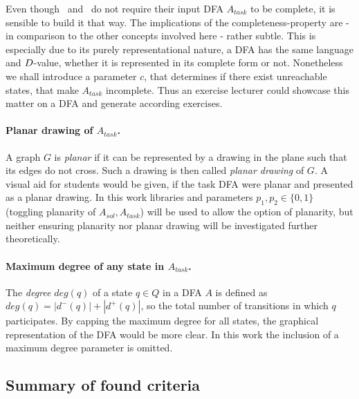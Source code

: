 Even though \CompUnr\ and \RemUnr\ do not require their input DFA $A_{task}$ to be complete, it is sensible to build it that way. The implications of the completeness-property are - in comparison to the other concepts involved here - rather subtle. This is especially due to its purely representational nature, a DFA has the same language and $D$-value, whether it is represented in its complete form or not. Nonetheless we shall introduce a parameter $c$, that determines if there exist unreachable states, that make $A_{task}$ incomplete. Thus an exercise lecturer could showcase this matter on a DFA and generate according exercises.

\paragraph*{Planar drawing of $A_{task}$.}

A graph $G$ is \emph{planar} if it can be represented by a drawing in the plane such that its edges do not cross. Such a drawing is then called \emph{planar drawing} of $G$. A visual aid for students would be given, if the task DFA were planar and presented as a planar drawing. In this work libraries and parameters $p_1, p_2 \in \{0,1\}$ (toggling planarity of $A_{sol}, A_{task}$) will be used to allow the option of planarity, but neither ensuring planarity nor planar drawing will be investigated further theoretically.

\paragraph*{Maximum degree of any state in $A_{task}$.}

The \emph{degree} $deg(q)$ of a state $q \in Q$ in a DFA $A$ is defined as $deg(q) = |d^-(q)| + |d^+(q)|$, so the total number of transitions in which $q$ participates. By capping the maximum degree for all states, the graphical representation of the DFA would be more clear. In this work the inclusion of a maximum degree parameter is omitted.


\subsection{Summary of found criteria}

